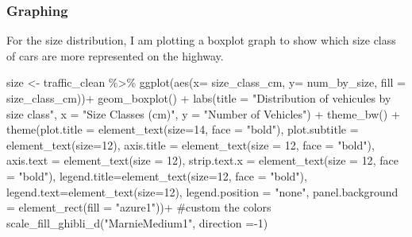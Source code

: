 \documentclass[
  10pt,
  letterpaper,
]{article}
\newenvironment{Shaded}{\begin{snugshade}}{\end{snugshade}}
\newcommand{\AttributeTok}[1]{\textcolor[rgb]{0.40,0.45,0.13}{#1}}
\newcommand{\CommentTok}[1]{\textcolor[rgb]{0.37,0.37,0.37}{#1}}
\newcommand{\DecValTok}[1]{\textcolor[rgb]{0.68,0.00,0.00}{#1}}
\newcommand{\FunctionTok}[1]{\textcolor[rgb]{0.28,0.35,0.67}{#1}}
\newcommand{\NormalTok}[1]{\textcolor[rgb]{0.00,0.23,0.31}{#1}}
\newcommand{\OtherTok}[1]{\textcolor[rgb]{0.00,0.23,0.31}{#1}}
\newcommand{\SpecialCharTok}[1]{\textcolor[rgb]{0.37,0.37,0.37}{#1}}
\newcommand{\StringTok}[1]{\textcolor[rgb]{0.13,0.47,0.30}{#1}}
\begin{document}
\subsubsection{Graphing}\label{graphing}

For the size distribution, I am plotting a boxplot graph to show which
size class of cars are more represented on the highway.

\begin{Shaded}
\begin{Highlighting}[]
\NormalTok{size }\OtherTok{\textless{}{-}}\NormalTok{ traffic\_clean }\SpecialCharTok{\%\textgreater{}\%} 
  \FunctionTok{ggplot}\NormalTok{(}\FunctionTok{aes}\NormalTok{(}\AttributeTok{x=}\NormalTok{ size\_class\_cm, }\AttributeTok{y=}\NormalTok{ num\_by\_size, }\AttributeTok{fill =}\NormalTok{ size\_class\_cm))}\SpecialCharTok{+}
  \FunctionTok{geom\_boxplot}\NormalTok{() }\SpecialCharTok{+}
  \FunctionTok{labs}\NormalTok{(}\AttributeTok{title =} \StringTok{"Distribution of vehicules by size class"}\NormalTok{,}
       \AttributeTok{x =} \StringTok{"Size Classes (cm)"}\NormalTok{,}
       \AttributeTok{y =} \StringTok{"Number of Vehicles"}\NormalTok{) }\SpecialCharTok{+}
  \FunctionTok{theme\_bw}\NormalTok{() }\SpecialCharTok{+} 
  \FunctionTok{theme}\NormalTok{(}\AttributeTok{plot.title =} \FunctionTok{element\_text}\NormalTok{(}\AttributeTok{size=}\DecValTok{14}\NormalTok{, }\AttributeTok{face =} \StringTok{"bold"}\NormalTok{), }
        \AttributeTok{plot.subtitle =} \FunctionTok{element\_text}\NormalTok{(}\AttributeTok{size=}\DecValTok{12}\NormalTok{),}
        \AttributeTok{axis.title =} \FunctionTok{element\_text}\NormalTok{(}\AttributeTok{size =} \DecValTok{12}\NormalTok{, }\AttributeTok{face =} \StringTok{"bold"}\NormalTok{),}
        \AttributeTok{axis.text =} \FunctionTok{element\_text}\NormalTok{(}\AttributeTok{size =} \DecValTok{12}\NormalTok{),}
        \AttributeTok{strip.text.x =} \FunctionTok{element\_text}\NormalTok{(}\AttributeTok{size =} \DecValTok{12}\NormalTok{, }\AttributeTok{face =} \StringTok{"bold"}\NormalTok{),}
        \AttributeTok{legend.title=}\FunctionTok{element\_text}\NormalTok{(}\AttributeTok{size=}\DecValTok{12}\NormalTok{, }\AttributeTok{face =} \StringTok{"bold"}\NormalTok{),}
        \AttributeTok{legend.text=}\FunctionTok{element\_text}\NormalTok{(}\AttributeTok{size=}\DecValTok{12}\NormalTok{),}
        \AttributeTok{legend.position =} \StringTok{"none"}\NormalTok{,}
        \AttributeTok{panel.background =} \FunctionTok{element\_rect}\NormalTok{(}\AttributeTok{fill =} \StringTok{"azure1"}\NormalTok{))}\SpecialCharTok{+}
  \CommentTok{\#custom the colors }
  \FunctionTok{scale\_fill\_ghibli\_d}\NormalTok{(}\StringTok{"MarnieMedium1"}\NormalTok{, }\AttributeTok{direction =}\SpecialCharTok{{-}}\DecValTok{1}\NormalTok{)}
\end{Highlighting}
\end{Shaded}
\end{document}
